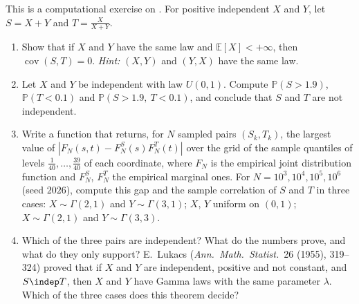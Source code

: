 \begin{exercise}\label{ex:rv-gamma-beta-sim}
\medium This is a computational exercise on . For positive independent
$X$ and $Y$, let $S=X+Y$ and $T=\frac X{X+Y}$.
\begin{enumerate}[label=(\alph*)]
  \item Show that if $X$ and $Y$ have the same law and $\mathbb E[X]<+\infty$, then
    $\operatorname{cov}(S,T)=0$. \emph{Hint:} $(X,Y)$ and $(Y,X)$ have the same law.
  \item Let $X$ and $Y$ be independent with law $U(0,1)$. Compute $\mathbb P(S>1.9)$,
    $\mathbb P(T<0.1)$ and $\mathbb P(S>1.9,\ T<0.1)$, and conclude that $S$ and $T$ are not
    independent.
  \item Write a function that returns, for $N$ sampled pairs $(S_k,T_k)$, the largest value of
    $|F_N(s,t)-F^S_N(s)F^T_N(t)|$ over the grid of the sample quantiles of levels
    $\frac1{40},\dots,\frac{39}{40}$ of each coordinate, where $F_N$ is the empirical joint distribution
    function and $F^S_N$, $F^T_N$ the empirical marginal ones. For $N=10^3,10^4,10^5,10^6$ (seed $2026$),
    compute this gap and the sample correlation of $S$ and $T$ in three cases: $X\sim\Gamma(2,1)$ and
    $Y\sim\Gamma(3,1)$; $X$, $Y$ uniform on $(0,1)$; $X\sim\Gamma(2,1)$ and $Y\sim\Gamma(3,3)$.
  \item Which of the three pairs are independent? What do the numbers prove, and what do they only
    support? E.~Lukacs (\emph{Ann.\ Math.\ Statist.}\ 26 (1955), 319--324) proved that if $X$ and
    $Y$ are independent, positive and not
    constant, and $S\indep T$, then $X$ and $Y$ have Gamma laws with the same parameter $\lambda$. Which
    of the three cases does this theorem decide?
\end{enumerate}
\end{exercise}


